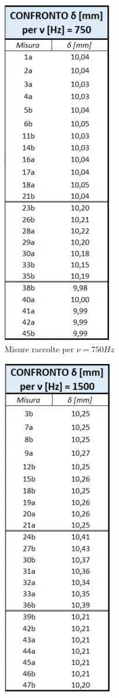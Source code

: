 \documentclass{article}
\begin{document}
\begin{figure}[h]
    \centering
    \begin{subfigure}[h]{0.2\textwidth}
        \centering
        \includegraphics{Coerenza_T1.JPG}
        \caption{Misure raccolte per $\nu=750Hz$}
        \label{Tab_750}        
    \end{subfigure}
    \hfill
    \begin{subfigure}[h]{0.2\textwidth}
        \centering
        \includegraphics{Coerenza_T2.JPG}

\end{subfigure}
\end{figure}
\end{document}
